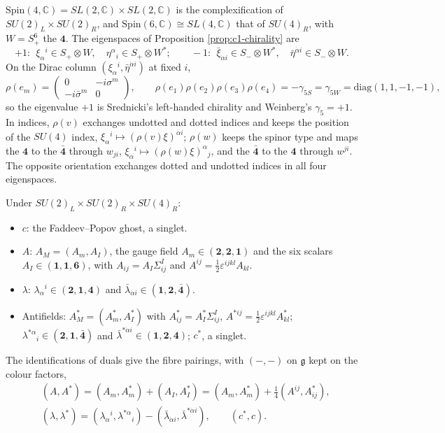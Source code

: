 \begin{remark}
$\mathrm{Spin}(4,\mathbb C)=SL(2,\mathbb C)\times SL(2,\mathbb C)$ is the complexification of $SU(2)_L\times SU(2)_R$, and $\mathrm{Spin}(6,\mathbb C)\cong SL(4,\mathbb C)$ that of $SU(4)_R$, with $W=S_+^6$ the $\mathbf 4$. The eigenspaces of Proposition \ref{prop:c1-chirality} are
\[
+1:\ \ \xi_\alpha{}^i\in S_+\otimes W,\quad \eta^\alpha{}_i\in S_+\otimes W^*;\qquad -1:\ \ \bar\xi_{\dot\alpha i}\in S_-\otimes W^*,\quad \bar\eta^{\dot\alpha i}\in S_-\otimes W .
\]
On the Dirac column $(\xi_\alpha{}^i,\bar\eta^{\dot\alpha i})$ at fixed $i$,
\[
\rho(e_m)=\begin{pmatrix}0&-i\sigma^m\\-i\bar\sigma^m&0\end{pmatrix},\qquad \rho(e_1)\rho(e_2)\rho(e_3)\rho(e_4)=-\gamma_{5S}=\gamma_{5W}=\mathrm{diag}(1,1,-1,-1),
\]
so the eigenvalue $+1$ is Srednicki's left-handed chirality and Weinberg's $\gamma_5=+1$. In indices, $\rho(v)$ exchanges undotted and dotted indices and keeps the position of the $SU(4)$ index, $\xi_\alpha{}^i\mapsto(\rho(v)\xi)^{\dot\alpha i}$; $\rho(w)$ keeps the spinor type and maps the $\mathbf 4$ to the $\bar{\mathbf 4}$ through $w_{ji}$, $\xi_\alpha{}^i\mapsto(\rho(w)\xi)^\alpha{}_j$, and the $\bar{\mathbf 4}$ to the $\mathbf 4$ through $w^{ji}$. The opposite orientation exchanges dotted and undotted indices in all four eigenspaces.
\end{remark}

\begin{remark}
Under $SU(2)_L\times SU(2)_R\times SU(4)_R$:
\begin{itemize}
\item $c$: the Faddeev--Popov ghost, a singlet.
\item $A$: $A_M=(A_m,A_I)$, the gauge field $A_m\in(\mathbf 2,\mathbf 2,\mathbf 1)$ and the six scalars $A_I\in(\mathbf 1,\mathbf 1,\mathbf 6)$, with $A_{ij}=A_I\Sigma^I_{ij}$ and $A^{ij}=\tfrac12\varepsilon^{ijkl}A_{kl}$.
\item $\lambda$: $\lambda_\alpha{}^i\in(\mathbf 2,\mathbf 1,\mathbf 4)$ and $\bar\lambda_{\dot\alpha i}\in(\mathbf 1,\mathbf 2,\bar{\mathbf 4})$.
\item Antifields: $A^*_M=(A^*_m,A^*_I)$ with $A^*_{ij}=A^*_I\Sigma^I_{ij}$, $A^{*ij}=\tfrac12\varepsilon^{ijkl}A^*_{kl}$; $\lambda^{*\alpha}{}_i\in(\mathbf 2,\mathbf 1,\bar{\mathbf 4})$ and $\bar\lambda^{*\dot\alpha i}\in(\mathbf 1,\mathbf 2,\mathbf 4)$; $c^*$, a singlet.
\end{itemize}
The identifications of duals give the fibre pairings, with $(-,-)$ on $\mathfrak g$ kept on the colour factors,
\[
\begin{aligned}
&(A,A^*)=(A_m,A^*_m)+(A_I,A^*_I)=(A_m,A^*_m)+\tfrac14(A^{ij},A^*_{ij}),\\
&(\lambda,\lambda^*)=(\lambda_\alpha{}^i,\lambda^{*\alpha}{}_i)-(\bar\lambda_{\dot\alpha i},\bar\lambda^{*\dot\alpha i}),\qquad (c^*,c).
\end{aligned}
\]
\end{remark}

